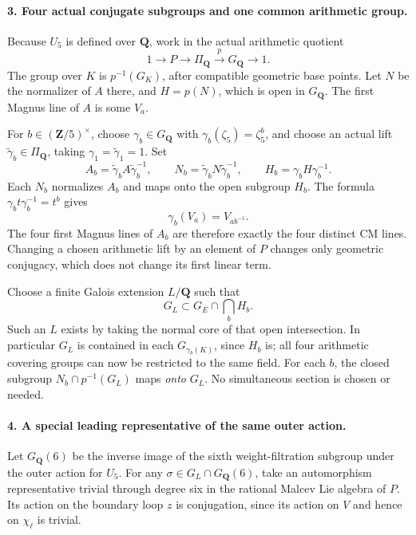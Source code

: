 \paragraph{3. Four actual conjugate subgroups and one common arithmetic group.}
Because $U_5$ is defined over $\mathbf Q$, work in the
actual arithmetic quotient
\[
 1\longrightarrow P\longrightarrow\Pi_{\mathbf Q}
   \xrightarrow{p}G_{\mathbf Q}\longrightarrow1.
\]
The group over $K$ is $p^{-1}(G_K)$, after compatible
geometric base points. Let $N$ be the normalizer of $A$
there, and $H=p(N)$, which is open in $G_{\mathbf Q}$.
The first Magnus line of $A$ is some $V_a$.

For $b\in(\mathbf Z/5)^\times$, choose
$\gamma_b\in G_{\mathbf Q}$ with
$\gamma_b(\zeta_5)=\zeta_5^b$, and choose an actual lift
$\widetilde\gamma_b\in\Pi_{\mathbf Q}$, taking
$\gamma_1=\widetilde\gamma_1=1$. Set
\[
 A_b=\widetilde\gamma_b A\widetilde\gamma_b^{-1},\qquad
 N_b=\widetilde\gamma_b N\widetilde\gamma_b^{-1},\qquad
 H_b=\gamma_bH\gamma_b^{-1}.
 \tag{X5.4}
\]
Each $N_b$ normalizes $A_b$ and maps onto the open subgroup
$H_b$. The formula
$\gamma_b t\gamma_b^{-1}=t^b$ gives
\[
 \gamma_b(V_a)=V_{ab^{-1}}.
\]
The four first Magnus lines of $A_b$ are therefore exactly
the four distinct CM lines. Changing a chosen arithmetic
lift by an element of $P$ changes only geometric conjugacy,
which does not change its first linear term.

Choose a finite Galois extension $L/\mathbf Q$ such that
\[
 G_L\subset G_E\cap\bigcap_b H_b.
 \tag{X5.5}
\]
Such an $L$ exists by taking the normal core of that open
intersection. In particular $G_L$ is contained in each
$G_{\gamma_b(K)}$, since $H_b$ is; all four arithmetic
covering groups can now be restricted to the same field.
For each $b$, the closed subgroup
$N_b\cap p^{-1}(G_L)$ maps \emph{onto} $G_L$.
No simultaneous section is chosen or needed.

\paragraph{4. A special leading representative of the same outer action.}
Let $G_{\mathbf Q}(6)$ be the inverse image of the sixth
weight-filtration subgroup under the outer action for
$U_5$. For any
$\sigma\in G_L\cap G_{\mathbf Q}(6)$, take an automorphism
representative trivial through degree six in the rational
Malcev Lie algebra of $P$. Its action on the boundary loop
$z$ is conjugation, since its action on $V$ and hence on
$\chi_\ell$ is trivial.

